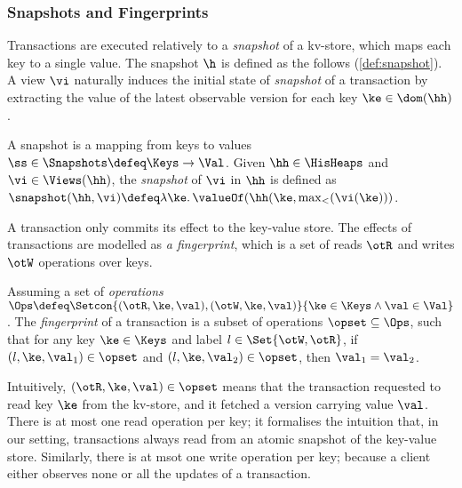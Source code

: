 \subsubsection{Snapshots and Fingerprints}
Transactions are executed relatively to a \emph{snapshot} of a kv-store, 
which maps each key to a single value.
The snapshot \( \h \) is defined as the follows (\cref{def:snapshot}).
A view $\vi$ naturally induces the initial state of \emph{snapshot} of a transaction
by extracting the value of the latest observable version for each key $\ke \in \dom(\hh)$. 


\begin{definition}[Snapshots]
\label{def:heaps}
\label{def:snapshot}
A snapshot is a mapping from keys to values \( \ss \in \Snapshots  \defeq \Keys \to \Val\).
Given $\hh \in \HisHeaps$ and $\vi \in \Views(\hh)$, the \emph{snapshot} of $\vi$ in 
$\hh$ is defined as $\snapshot(\hh, \vi) \defeq \lambda \ke \ldotp \valueOf(\hh(\ke, \max_{<}(\vi(\ke)))$.
\end{definition}

A transaction only commits its effect to the key-value store.
The effects of transactions are modelled as \emph{a fingerprint},
which is a set of reads \( \otR \) and writes \( \otW \) operations over keys.

\begin{definition}[Fingerprints]
Assuming a set of \emph{operations}
$\Ops \defeq \Setcon{(\otR, \ke, \val), (\otW, \ke, \val) }{ \ke \in \Keys \wedge \val \in \Val }$.
The \emph{fingerprint} of a transaction is a subset of operations $\opset \subseteq \Ops$, 
such that for any key $\ke \in \Keys$ and label \( l \in \Set{\otW, \otR} \),
if $(l, \ke, \val_1) \in \opset$ and $(l, \ke, \val_2) \in \opset$, then $\val_1 = \val_2$.
\end{definition}

Intuitively, $(\otR, \ke, \val) \in \opset$ means that 
the transaction requested to read key $\ke$ from the kv-store, 
and it fetched a version carrying value $\val$.
There is at most one read operation per key; 
it formalises the intuition that, in our setting, 
transactions always read from an atomic snapshot of the key-value store. 
Similarly, there is at msot one write operation per key;
because a client either observes none or all the updates of a transaction.


